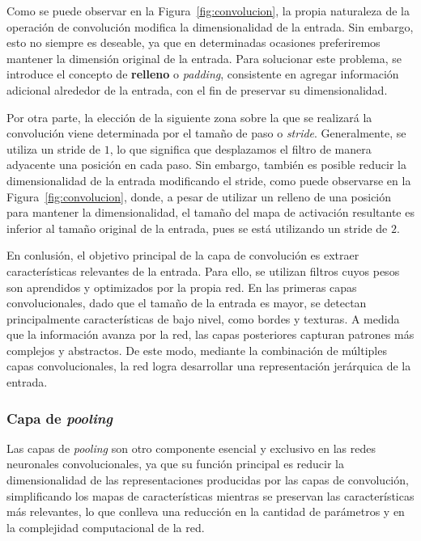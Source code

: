 Como se puede observar en la Figura~\ref{fig:convolucion}, la propia naturaleza de la operación de convolución modifica la dimensionalidad de la entrada. Sin embargo, esto no siempre es deseable, ya que en determinadas ocasiones preferiremos mantener la dimensión original de la entrada. Para solucionar este problema, se introduce el concepto de \textbf{relleno} o \emph{padding}, consistente en agregar información adicional alrededor de la entrada, con el fin de preservar su dimensionalidad.

Por otra parte, la elección de la siguiente zona sobre la que se realizará la convolución viene determinada por el tamaño de paso o \emph{stride}. Generalmente, se utiliza un stride de $1$, lo que significa que desplazamos el filtro de manera adyacente una posición en cada paso. Sin embargo, también es posible reducir la dimensionalidad de la entrada modificando el stride, como puede observarse en la Figura~\ref{fig:convolucion}, donde, a pesar de utilizar un relleno de una posición para mantener la dimensionalidad, el tamaño del mapa de activación resultante es inferior al tamaño original de la entrada, pues se está utilizando un stride de $2$.

En conlusión, el objetivo principal de la capa de convolución es extraer características relevantes de la entrada. Para ello, se utilizan filtros cuyos pesos son aprendidos y optimizados por la propia red. En las primeras capas convolucionales, dado que el tamaño de la entrada es mayor, se detectan principalmente características de bajo nivel, como bordes y texturas. A medida que la información avanza por la red, las capas posteriores capturan patrones más complejos y abstractos. De este modo, mediante la combinación de múltiples capas convolucionales, la red logra desarrollar una representación jerárquica de la entrada.

\subsubsection{Capa de \textit{pooling}}

Las capas de \textit{pooling} son otro componente esencial y exclusivo en las redes neuronales convolucionales, ya que su función principal es reducir la dimensionalidad de las representaciones producidas por las capas de convolución, simplificando los mapas de características mientras se preservan las características más relevantes, lo que conlleva una reducción en la cantidad de parámetros y en la complejidad computacional de la red.

